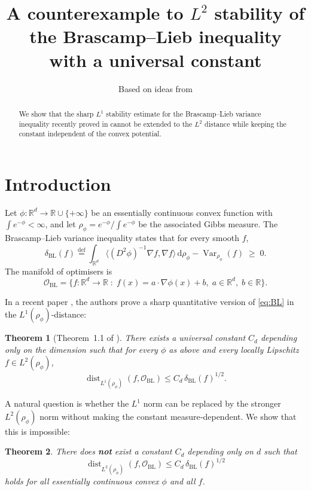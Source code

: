 \documentclass{article}
\title{A counterexample to $L^2$ stability of the Brascamp--Lieb inequality\\
with a universal constant}
\author{Based on ideas from \cite{BLpaper}}
\date{}
\newtheorem{theorem}{Theorem}[section]
\theoremstyle{definition}
\theoremstyle{remark}
\DeclareMathOperator{\Var}{Var}
\DeclareMathOperator{\dist}{dist}
\begin{document}
\maketitle

\begin{abstract}
We show that the sharp $L^1$ stability estimate for the Brascamp--Lieb variance inequality
recently proved in \cite{BLpaper} cannot be extended to the $L^2$ distance while keeping the
constant independent of the convex potential.
\end{abstract}

\section{Introduction}
Let $\phi:\mathbb{R}^d\to\mathbb{R}\cup\{+\infty\}$ be an essentially continuous convex function
with $\int e^{-\phi}<\infty$, and let $\rho_\phi = e^{-\phi}/\int e^{-\phi}$ be the associated
Gibbs measure.  The Brascamp--Lieb variance inequality \cite{BL76,BL00} states that for every
smooth $f$,
\begin{equation}\label{eq:BL}
\delta_{\mathrm{BL}}(f)\stackrel{\text{def}}{=}
\int_{\mathbb{R}^d}\bigl\langle (D^2\phi)^{-1}\nabla f,\nabla f\bigr\rangle\,\mathrm{d}\rho_\phi
-\Var_{\rho_\phi}(f)\;\ge\;0 .
\end{equation}
The manifold of optimisers is
\[
\mathcal{O}_{\mathrm{BL}} =
\{f:\mathbb{R}^d\to\mathbb{R} \;:\; f(x)=a\cdot\nabla\phi(x)+b,\; a\in\mathbb{R}^d,\; b\in\mathbb{R}\}.
\]

In a recent paper \cite{BLpaper}, the authors prove a sharp quantitative version of \eqref{eq:BL} in the
$L^1(\rho_\phi)$-distance:
\begin{theorem}[Theorem~1.1 of \cite{BLpaper}]\label{thm:L1}
There exists a universal constant $C_d$ depending only on the dimension such that for every $\phi$ as above
and every locally Lipschitz $f\in L^2(\rho_\phi)$,
\[
\dist_{L^1(\rho_\phi)}(f,\mathcal{O}_{\mathrm{BL}})\le C_d\,\delta_{\mathrm{BL}}(f)^{1/2}.
\]
\end{theorem}
A natural question is whether the $L^1$ norm can be replaced by the stronger $L^2(\rho_\phi)$ norm
without making the constant measure‑dependent.  We show that this is impossible:
\begin{theorem}\label{thm:L2fail}
There does \textbf{not} exist a constant $C_d$ depending only on $d$ such that
\[
\dist_{L^2(\rho_\phi)}(f,\mathcal{O}_{\mathrm{BL}})\le C_d\,\delta_{\mathrm{BL}}(f)^{1/2}
\]
holds for all essentially continuous convex $\phi$ and all $f$.
\end{theorem}
\end{document}
